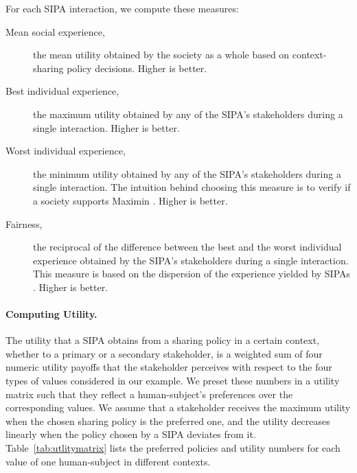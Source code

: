 For each SIPA interaction, we compute these measures:

\begin{description}
\item[Mean social experience,] the mean utility obtained by the society as a whole based on context-sharing policy decisions. Higher is better.
\item[Best individual experience,] the maximum utility obtained by any of the SIPA's stakeholders during a single interaction. Higher is better.
\item[Worst individual experience,] the minimum utility obtained by any of the SIPA's stakeholders during a single interaction. The intuition behind choosing this measure is to verify if a society supports Maximin \citep{Leben2017Rawls}. Higher is better. 
\item[Fairness,] the reciprocal of the difference between the best and the worst individual experience obtained by the SIPA's stakeholders during a single interaction. This measure is based on the dispersion of the experience yielded by SIPAs \citep{rawls1985justice}. Higher is better. 
\end{description}

\paragraph*{Computing Utility.} The utility that a SIPA obtains from a sharing policy in a certain context, whether to a primary or a secondary stakeholder, 
is a weighted sum of four numeric utility payoffs that the stakeholder perceives with respect to the four types of values considered in our example. We preset these numbers in a utility matrix such that they reflect a human-subject's preferences over the corresponding values. We assume that a stakeholder receives the maximum utility when the chosen sharing policy is the preferred one, and the utility decreases linearly when the policy chosen by a SIPA deviates from it. Table~\ref{tab:utlitymatrix} lists the preferred policies and utility numbers for each value of one human-subject in different contexts. 

